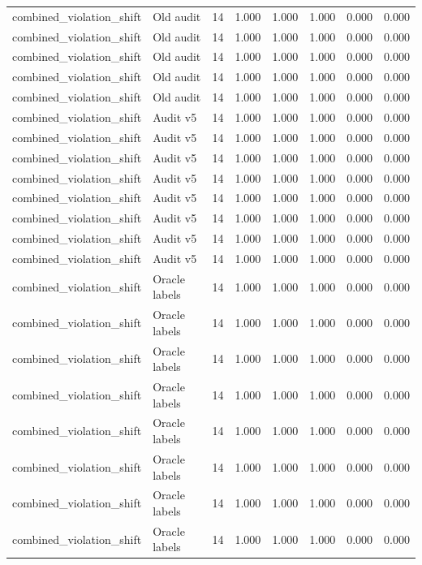 {\begin{longtable}{llrrrrrr}
combined\_violation\_shift & Old audit & 14 & 1.000 & 1.000 & 1.000 & 0.000 & 0.000 \\
combined\_violation\_shift & Old audit & 14 & 1.000 & 1.000 & 1.000 & 0.000 & 0.000 \\
combined\_violation\_shift & Old audit & 14 & 1.000 & 1.000 & 1.000 & 0.000 & 0.000 \\
combined\_violation\_shift & Old audit & 14 & 1.000 & 1.000 & 1.000 & 0.000 & 0.000 \\
combined\_violation\_shift & Old audit & 14 & 1.000 & 1.000 & 1.000 & 0.000 & 0.000 \\
combined\_violation\_shift & Audit v5 & 14 & 1.000 & 1.000 & 1.000 & 0.000 & 0.000 \\
combined\_violation\_shift & Audit v5 & 14 & 1.000 & 1.000 & 1.000 & 0.000 & 0.000 \\
combined\_violation\_shift & Audit v5 & 14 & 1.000 & 1.000 & 1.000 & 0.000 & 0.000 \\
combined\_violation\_shift & Audit v5 & 14 & 1.000 & 1.000 & 1.000 & 0.000 & 0.000 \\
combined\_violation\_shift & Audit v5 & 14 & 1.000 & 1.000 & 1.000 & 0.000 & 0.000 \\
combined\_violation\_shift & Audit v5 & 14 & 1.000 & 1.000 & 1.000 & 0.000 & 0.000 \\
combined\_violation\_shift & Audit v5 & 14 & 1.000 & 1.000 & 1.000 & 0.000 & 0.000 \\
combined\_violation\_shift & Audit v5 & 14 & 1.000 & 1.000 & 1.000 & 0.000 & 0.000 \\
combined\_violation\_shift & Oracle labels & 14 & 1.000 & 1.000 & 1.000 & 0.000 & 0.000 \\
combined\_violation\_shift & Oracle labels & 14 & 1.000 & 1.000 & 1.000 & 0.000 & 0.000 \\
combined\_violation\_shift & Oracle labels & 14 & 1.000 & 1.000 & 1.000 & 0.000 & 0.000 \\
combined\_violation\_shift & Oracle labels & 14 & 1.000 & 1.000 & 1.000 & 0.000 & 0.000 \\
combined\_violation\_shift & Oracle labels & 14 & 1.000 & 1.000 & 1.000 & 0.000 & 0.000 \\
combined\_violation\_shift & Oracle labels & 14 & 1.000 & 1.000 & 1.000 & 0.000 & 0.000 \\
combined\_violation\_shift & Oracle labels & 14 & 1.000 & 1.000 & 1.000 & 0.000 & 0.000 \\
combined\_violation\_shift & Oracle labels & 14 & 1.000 & 1.000 & 1.000 & 0.000 & 0.000 \\

\end{longtable}}
